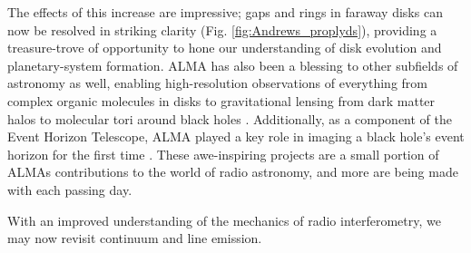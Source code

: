 \begin{figure}[htp]
  \hspace*{\fill}%
  \hfill%
  \hspace*{\fill}%
\end{figure}


The effects of this increase are impressive; gaps and rings in faraway disks can now be resolved in striking clarity (Fig. \ref{fig:Andrews_proplyds}), providing a treasure-trove of opportunity to hone our understanding of disk evolution and planetary-system formation. ALMA has also been a blessing to other subfields of astronomy as well, enabling high-resolution observations of everything from complex organic molecules in disks \citep{Walsh2016,Podio2019} to gravitational lensing from dark matter halos \citep{Herrera-Martin2019} to molecular tori around black holes \citep{Combes2018}. Additionally, as a component of the Event Horizon Telescope, ALMA played a key role in imaging a black hole's event horizon for the first time \citep{EHTCollab2019}. These awe-inspiring projects are a small portion of ALMAs contributions to the world of radio astronomy, and more are being made with each passing day.


With an improved understanding of the mechanics of radio interferometry, we may now revisit continuum and line emission.





